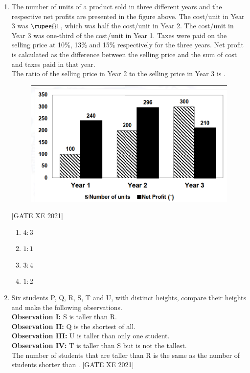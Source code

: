 \documentclass[journal,12pt,onecolumn]{IEEEtran}
\theoremstyle{remark}
\begin{document}
\begin{enumerate}
  \item The number of units of a product sold in three different years and the respective net profits are presented in the figure above. The cost/unit in Year 3 was $\rupee{}1$, which was half the cost/unit in Year 2. The cost/unit in Year 3 was one-third of the cost/unit in Year 1. Taxes were paid on the selling price at 10\%, 13\% and 15\% respectively for the three years. Net profit is calculated as the difference between the selling price and the sum of cost and taxes paid in that year.\\
  The ratio of the selling price in Year 2 to the selling price in Year 3 is \underline{\hspace{1.5cm}}. 
  \begin{figure}[H]
      \centering
      \includegraphics[width=0.5\columnwidth]{figs/fig5.png}
      \caption{}
      \label{fig:placeholder}
  \end{figure}
  
  \hfill[GATE XE 2021]

  \begin{multicols}{2}
  \begin{enumerate}
    \item $4:3$
    \item $1:1$
    \item $3:4$
    \item $1:2$
  \end{enumerate}
  \end{multicols}

  \item Six students P, Q, R, S, T and U, with distinct heights, compare their heights and make the following observations.\\
  \textbf{Observation I:} S is taller than R.\\
  \textbf{Observation II:} Q is the shortest of all.\\
  \textbf{Observation III:} U is taller than only one student.\\
  \textbf{Observation IV:} T is taller than S but is not the tallest.\\
  The number of students that are taller than R is the same as the number of students shorter than \underline{\hspace{1.5cm}}. \hfill[GATE XE 2021]


\end{enumerate}
\end{document}
